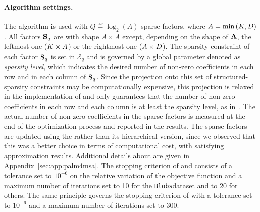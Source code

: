 \paragraph{Algorithm settings.} 
The \qkmeans algorithm is used with $Q\eqdef\log_2\left (A\right )$ sparse factors, where  $A=\min\left (K, D\right )$. 
All factors ${\mathbf{S}}_q$ are with shape $A \times A$ except, depending on the shape of ${\mathbf{A}}$, the leftmost one ($K\times A$) or the rightmost one ($A\times D$). 
The sparsity constraint of each factor ${\mathbf{S}}_q$ is set in $\mathcal{E}_q$ and is governed by a global parameter denoted as \textit{sparsity level}, which indicates the desired number of non-zero coefficients in each row and in each column of ${\mathbf{S}}_q$. 
Since the projection onto this set of structured-sparsity constraints may be computationally expensive, this projection is relaxed in the implementation of \palm and only guarantees that the number of non-zero coefficients in each row and each column is at least the sparsity level, as in~\cite{LeMagoarou2016Flexible}.
The actual number of non-zero coefficients in the sparse factors is measured at the end of the optimization process and reported in the results.
The sparse factors are updated using the \palm rather than its hierarchical version, since we observed that this was a better choice in terms of computational cost, with satisfying approximation results.
Additional details about \palm are given in Appendix~\ref{sec:app:palm4msa}.
The stopping criterion of \kmeans and \qkmeans consists of a tolerance set to $10^{-6}$ on the relative variation of the objective function and a maximum number of iterations set to 10 for the \texttt{Blobs}dataset and to 20 for others. The same principle governs the stopping criterion of \palm with a tolerance set to $10^{-6}$ and a maximum number of iterations set to 300.

%



